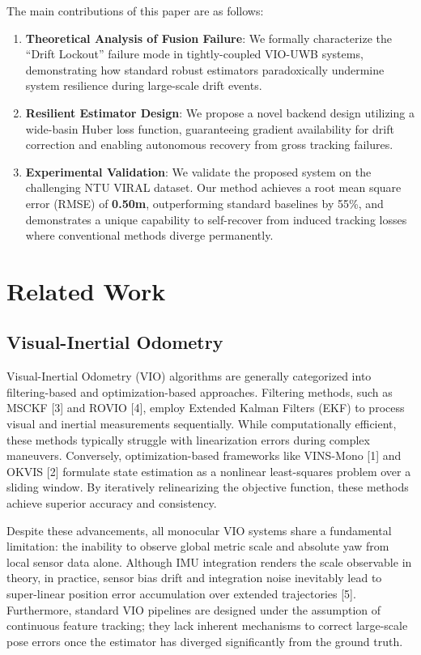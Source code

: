 \documentclass[conference]{IEEEtran}
\begin{document}
The main contributions of this paper are as follows:
\begin{enumerate}
    \item \textbf{Theoretical Analysis of Fusion Failure}: We formally characterize the ``Drift Lockout'' failure mode in tightly-coupled VIO-UWB systems, demonstrating how standard robust estimators paradoxically undermine system resilience during large-scale drift events.
    \item \textbf{Resilient Estimator Design}: We propose a novel backend design utilizing a wide-basin Huber loss function, guaranteeing gradient availability for drift correction and enabling autonomous recovery from gross tracking failures.
    \item \textbf{Experimental Validation}: We validate the proposed system on the challenging NTU VIRAL dataset. Our method achieves a root mean square error (RMSE) of \textbf{0.50m}, outperforming standard baselines by 55\%, and demonstrates a unique capability to self-recover from induced tracking losses where conventional methods diverge permanently.
\end{enumerate}

\section{Related Work}

\subsection{Visual-Inertial Odometry}
Visual-Inertial Odometry (VIO) algorithms are generally categorized into filtering-based and optimization-based approaches. Filtering methods, such as MSCKF [3] and ROVIO [4], employ Extended Kalman Filters (EKF) to process visual and inertial measurements sequentially. While computationally efficient, these methods typically struggle with linearization errors during complex maneuvers. Conversely, optimization-based frameworks like VINS-Mono [1] and OKVIS [2] formulate state estimation as a nonlinear least-squares problem over a sliding window. By iteratively relinearizing the objective function, these methods achieve superior accuracy and consistency.

Despite these advancements, all monocular VIO systems share a fundamental limitation: the inability to observe global metric scale and absolute yaw from local sensor data alone. Although IMU integration renders the scale observable in theory, in practice, sensor bias drift and integration noise inevitably lead to super-linear position error accumulation over extended trajectories [5]. Furthermore, standard VIO pipelines are designed under the assumption of continuous feature tracking; they lack inherent mechanisms to correct large-scale pose errors once the estimator has diverged significantly from the ground truth.
\end{document}
